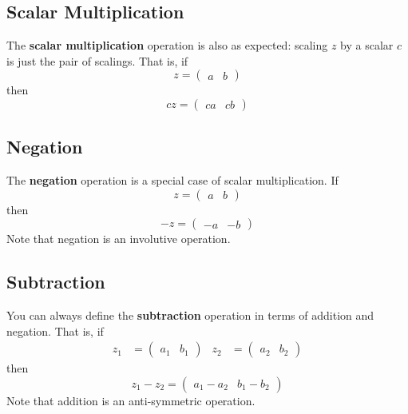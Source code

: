 \subsection{Scalar Multiplication}
The \textbf{scalar multiplication} operation is also as expected: scaling $z$ by a scalar $c$ is just the pair of scalings. That is, if
\begin{equation}
    z = \begin{pmatrix}
        a & b
    \end{pmatrix}
\end{equation}
then
\begin{equation}
    cz = \begin{pmatrix}
        ca & cb
    \end{pmatrix}
\end{equation}
\subsection{Negation}
The \textbf{negation} operation is a special case of scalar multiplication. If
\begin{equation}
    z = \begin{pmatrix}
        a & b
    \end{pmatrix}
\end{equation}
then
\begin{equation}
    {-z} = \begin{pmatrix}
        -a & -b
    \end{pmatrix}
\end{equation}
Note that negation is an involutive operation.
\subsection{Subtraction}
You can always define the \textbf{subtraction} operation in terms of addition and negation. That is, if
\begin{align*}
    z_{1} &= \begin{pmatrix}
        a_{1} & b_{1}
    \end{pmatrix} &
    z_{2} &= \begin{pmatrix}
        a_{2} & b_{2}
    \end{pmatrix}
\end{align*}
then
\begin{equation}
    z_{1} - z_{2} = \begin{pmatrix}
        a_{1} - a_{2} & b_{1} - b_{2}
    \end{pmatrix}
\end{equation}
Note that addition is an anti-symmetric operation.
